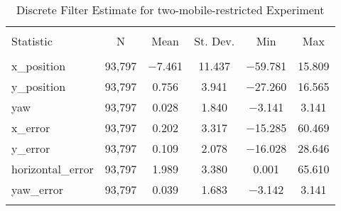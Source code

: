 
\begin{table}[h] \centering 
  \caption{Discrete Filter Estimate for two-mobile-restricted Experiment} 
  \label{tab:two_mobile_restricted_discrete_summary} 
\begin{tabular}{@{\extracolsep{5pt}}lccccc} 
\\[-1.8ex]\hline 
\hline \\[-1.8ex] 
Statistic & \multicolumn{1}{c}{N} & \multicolumn{1}{c}{Mean} & \multicolumn{1}{c}{St. Dev.} & \multicolumn{1}{c}{Min} & \multicolumn{1}{c}{Max} \\ 
\hline \\[-1.8ex] 
x\_position & 93,797 & $-$7.461 & 11.437 & $-$59.781 & 15.809 \\ 
y\_position & 93,797 & 0.756 & 3.941 & $-$27.260 & 16.565 \\ 
yaw & 93,797 & 0.028 & 1.840 & $-$3.141 & 3.141 \\ 
x\_error & 93,797 & 0.202 & 3.317 & $-$15.285 & 60.469 \\ 
y\_error & 93,797 & 0.109 & 2.078 & $-$16.028 & 28.646 \\ 
horizontal\_error & 93,797 & 1.989 & 3.380 & 0.001 & 65.610 \\ 
yaw\_error & 93,797 & 0.039 & 1.683 & $-$3.142 & 3.141 \\ 
\hline \\[-1.8ex] 
\end{tabular} 
\end{table} 
